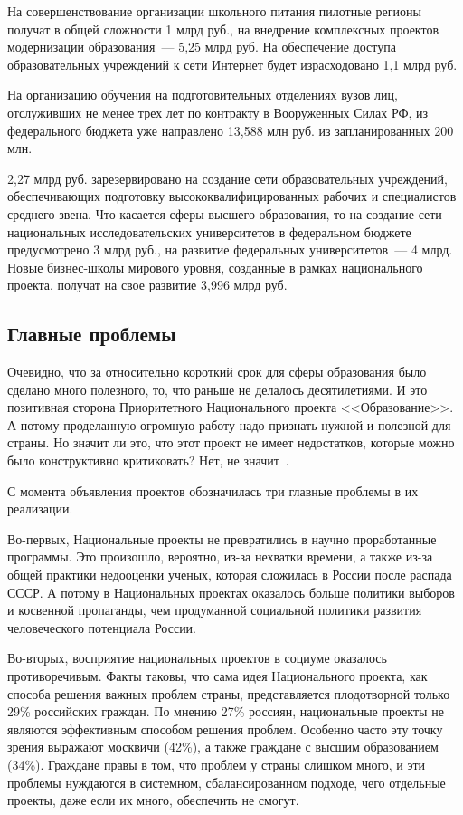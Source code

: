 \documentclass[article, 12pt, russian, oneside]{ncc}
\begin{document}
На совершенствование организации школьного питания пилотные регионы
получат в общей сложности 1 млрд руб., на внедрение комплексных
проектов модернизации образования~--- 5,25 млрд руб. На обеспечение
доступа образовательных учреждений к сети Интернет будет израсходовано
1,1 млрд руб.

На организацию обучения на подготовительных отделениях вузов лиц,
отслуживших не менее трех лет по контракту в Вооруженных Силах РФ, из
федерального бюджета уже направлено 13,588 млн руб. из запланированных
200 млн.

2,27 млрд руб. зарезервировано на создание сети образовательных
учреждений, обеспечивающих подготовку высококвалифицированных рабочих
и специалистов среднего звена. Что касается сферы высшего образования,
то на создание сети национальных исследовательских университетов в
федеральном бюджете предусмотрено 3 млрд руб., на развитие федеральных
университетов~--- 4 млрд. Новые бизнес-школы мирового уровня, созданные
в рамках национального проекта, получат на свое развитие 3,996 млрд
руб.


\subsection{Главные проблемы}

Очевидно, что за относительно короткий срок для сферы образования было
сделано много полезного, то, что раньше не делалось десятилетиями. И
это позитивная сторона Приоритетного Национального проекта
<<Образование>>. А потому проделанную огромную работу надо признать
нужной и полезной для страны. Но значит ли это, что этот проект не
имеет недостатков, которые можно было конструктивно критиковать? Нет,
не значит~\cite{Edu_Result}.

С момента объявления проектов обозначилась три главные проблемы в их
реализации.

Во-первых, Национальные проекты не превратились в научно проработанные
программы. Это произошло, вероятно, из-за нехватки времени, а также
из-за общей практики недооценки ученых, которая сложилась в России
после распада СССР. А потому в Национальных проектах оказалось больше
политики выборов и косвенной пропаганды, чем продуманной социальной
политики развития человеческого потенциала России.

Во-вторых, восприятие национальных проектов в социуме оказалось
противоречивым. Факты таковы, что сама идея Национального проекта, как
способа решения важных проблем страны, представляется плодотворной
только 29\% российских граждан. По мнению 27\% россиян, национальные
проекты не являются эффективным способом решения проблем. Особенно
часто эту точку зрения выражают москвичи (42\%), а также граждане с
высшим образованием (34\%). Граждане правы в том, что проблем у страны
слишком много, и эти проблемы нуждаются в системном, сбалансированном
подходе, чего отдельные проекты, даже если их много, обеспечить не
смогут.
\end{document}
